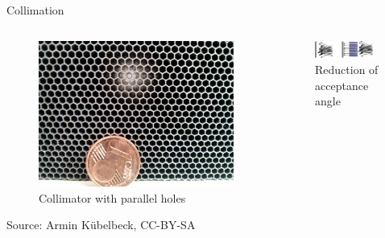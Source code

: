 \begin{frame}[c]{Collimation}
    \begin{center}
        \begin{columns}[c, onlytextwidth]
            \begin{column}{0.5\textwidth}

                \begin{figure}[]
                    \centering
                    \includegraphics[width=0.8\linewidth]{images/800px-Parallellochkollimator_01.jpg}
                    \caption{Collimator with parallel holes}
                \end{figure}
                \begin{flushright}
                    \tiny Source: Armin Kübelbeck, CC-BY-SA
                \end{flushright}
            \end{column}\begin{column}{0.5\textwidth}
                \begin{figure}[]
                    \centering
                    \includegraphics[width=0.9\textwidth]{images/colli_how}
                    \caption{Reduction of acceptance angle}
                \end{figure}
            \end{column}
        \end{columns}
    \end{center}
\end{frame}

